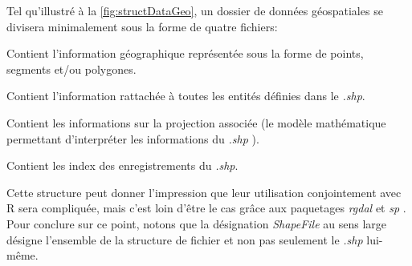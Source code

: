 \noindent
Tel qu'illustré à la \autoref{fig:structDataGeo}, un dossier de données géospatiales se divisera minimalement sous la forme de quatre fichiers:
\begin{description}[style=multiline,leftmargin=1.5cm]
	\item[\emph{.shp}] Contient l'information géographique représentée sous la forme de points, segments et/ou polygones.
	\item[\emph{.dbf}] Contient l'information rattachée à toutes les entités définies dans le \emph{.shp}.
	\item[\emph{.prj}] Contient les informations sur la projection associée (le modèle mathématique permettant d'interpréter les informations du \emph{.shp} \cite{projectionSIG}).
	\item[{.shx}] Contient les index des enregistrements du \emph{.shp}.
\end{description}
Cette structure peut donner l'impression que leur utilisation conjointement avec R sera compliquée, mais c'est loin d'être le cas grâce aux paquetages \emph{rgdal} \cite{Rpackage:rgdal} et \emph{sp}\cite{Rpackage:sp} . Pour conclure sur ce point, notons que la désignation \emph{ShapeFile} au sens large désigne l'ensemble de la structure de fichier et non pas seulement le \emph{.shp} lui-même. \cite{portailSIG} \\

